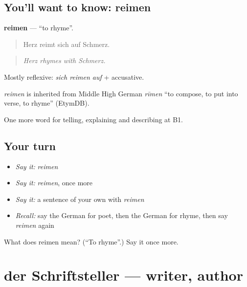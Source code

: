\subsection*{You'll want to know: reimen}
\textbf{reimen} — \textquotedblleft{}to rhyme\textquotedblright{}.

\begin{quote}
Herz reimt sich auf Schmerz.
\end{quote}

\begin{quote}
\emph{Herz rhymes with Schmerz.}
\end{quote}

Mostly reflexive: \emph{sich reimen auf} + accusative.

\begin{cousinweb}
\emph{reimen} is inherited from Middle High German \emph{rīmen} \textquotedblleft{}to compose, to put into verse, to rhyme\textquotedblright{} (EtymDB).
\end{cousinweb}

\begin{grammarlens}[title={What you've built}]
One more word for telling, explaining and describing at B1.
\end{grammarlens}

\subsection*{Your turn}
\begin{itemize}
\raggedright
  \item \emph{Say it:} \emph{reimen}
  \item \emph{Say it:} \emph{reimen}, once more
  \item \emph{Say it:} a sentence of your own with \emph{reimen}
  \item \emph{Recall:} say the German for poet, then the German for rhyme, then say \emph{reimen} again
\end{itemize}

\begin{tcolorbox}[breakable,colback=teal!4,colframe=teal!35!black,title={Before you move on}]
What does reimen mean? (\textquotedblleft{}To rhyme\textquotedblright{}.) Say it once more.
\end{tcolorbox}
\section[der Schriftsteller]{der Schriftsteller — writer, author}

